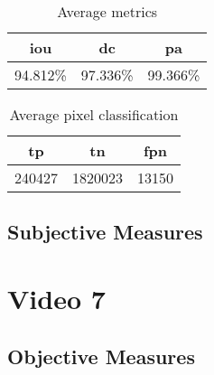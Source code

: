 \begin{minipage}[c]{0.475\textwidth}
\begin{table}[H]
    \centering
    \begin{tabular}{||c c c||} 
        \hline
        \acrshort{iou} & \acrshort{dc} & \acrshort{pa} \\ [0.5ex] 
        \hline\hline
        94.812\% & 97.336\% & 99.366\% \\ [1ex] 
        \hline
    \end{tabular}
    \caption{Average metrics}
    \label{tab:metrics_video_5}
\end{table}
\end{minipage}
\begin{minipage}[c]{0.475\textwidth}
\begin{table}[H]
    \centering
    \begin{tabular}{||c c c||} 
        \hline
        \acrshort{tp} & \acrshort{tn} & \acrshort{fpn} \\ [0.5ex] 
        \hline\hline
        240427 & 1820023 & 13150 \\ [1ex] 
        \hline
    \end{tabular}
    \caption{Average pixel classification}
    \label{tab:pixels_video_5}
\end{table}
\end{minipage}

\subsection{Subjective Measures}


\section{Video 7}
\subsection{Objective Measures}

